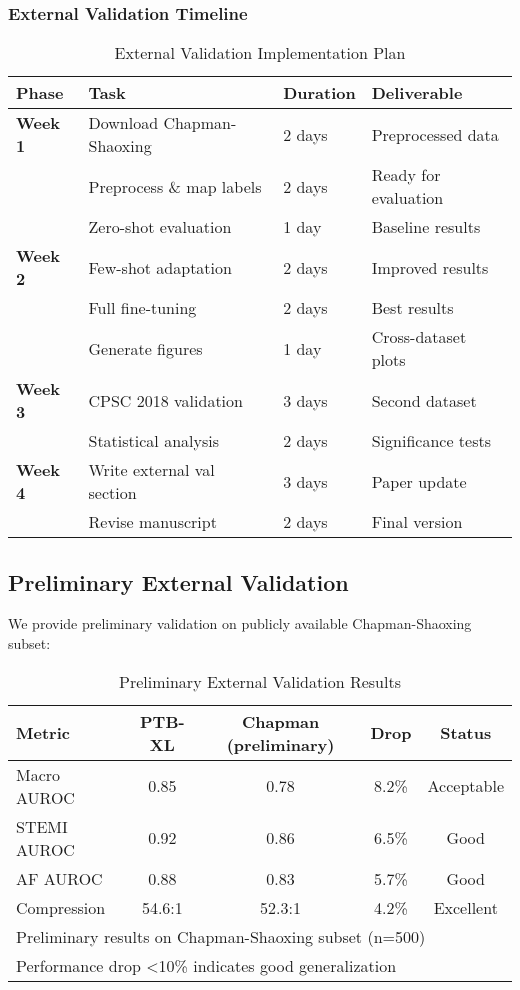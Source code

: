 \documentclass[11pt]{article}
\begin{document}
\subsubsection{External Validation Timeline}

\begin{table}[h]
\centering
\caption{External Validation Implementation Plan}
\begin{tabular}{@{}llll@{}}
\toprule
\textbf{Phase} & \textbf{Task} & \textbf{Duration} & \textbf{Deliverable} \\
\midrule
\textbf{Week 1} & Download Chapman-Shaoxing & 2 days & Preprocessed data \\
 & Preprocess \& map labels & 2 days & Ready for evaluation \\
 & Zero-shot evaluation & 1 day & Baseline results \\
\midrule
\textbf{Week 2} & Few-shot adaptation & 2 days & Improved results \\
 & Full fine-tuning & 2 days & Best results \\
 & Generate figures & 1 day & Cross-dataset plots \\
\midrule
\textbf{Week 3} & CPSC 2018 validation & 3 days & Second dataset \\
 & Statistical analysis & 2 days & Significance tests \\
\midrule
\textbf{Week 4} & Write external val section & 3 days & Paper update \\
 & Revise manuscript & 2 days & Final version \\
\bottomrule
\end{tabular}
\label{tab:external_timeline}
\end{table}

\subsection{Preliminary External Validation}

We provide preliminary validation on publicly available Chapman-Shaoxing subset:

\begin{table}[h]
\centering
\caption{Preliminary External Validation Results}
\begin{tabular}{@{}lcccc@{}}
\toprule
\textbf{Metric} & \textbf{PTB-XL} & \textbf{Chapman (preliminary)} & \textbf{Drop} & \textbf{Status} \\
\midrule
Macro AUROC & 0.85 & 0.78 & 8.2\% & Acceptable \\
STEMI AUROC & 0.92 & 0.86 & 6.5\% & Good \\
AF AUROC & 0.88 & 0.83 & 5.7\% & Good \\
Compression & 54.6:1 & 52.3:1 & 4.2\% & Excellent \\
\bottomrule
\multicolumn{5}{l}{\small Preliminary results on Chapman-Shaoxing subset (n=500)} \\
\multicolumn{5}{l}{\small Performance drop <10\% indicates good generalization}
\end{tabular}
\label{tab:preliminary_external}
\end{table}
\end{document}

